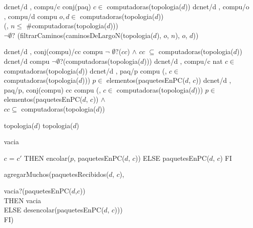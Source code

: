 \begin{tad}{}
\tadOtrasOperaciones
{}
	 {dcnet/d , compu/c} {conj(paq)} {$c\in$ computadoras(topologia($d$))}
	 {dcnet/d , compu/o , compu/d} {compu} {$o,d \in$ computadoras(topologia($d$)) \yluego \\
																				(, $n \leq$ \#computadoras(topologia($d$)))\\
																				$\neg\emptyset?$
																				(filtrarCaminos(caminosDeLargoN(topologia($d$), $o$, $n$),
																				 $o$, $d$))}
		

	 {dcnet/d , conj(compu)/cc} {compu} {$\neg$ $\emptyset?$($cc$) $\wedge$ 
																	$cc$ $\subseteq$ computadoras(topologia($d$))}	
	 {dcnet/d} {compu} {$\neg\emptyset$?(computadoras(topologia($d$)))}   
	 {dcnet/d , compu/c} {nat}	{$c\in$ computadoras(topologia($d$))}							  
	 {dcnet/d , paq/p} {compu} {(, $c \in$ computadoras(topologia($d$))) $p\in$ elementos(paquetesEnPC($d$, $c$))}
	 {dcnet/d , paq/p, conj(compu) cc} {compu} {(, $c \in$ computadoras(topologia($d$))) $p\in$ elementos(paquetesEnPC($d$, $c$)) $\wedge$ \\ $cc \subseteq$ computadoras(topologia($d$))}


	 {topologia($d$)}
	 {topologia($d$)}

	 {vacia}

			
	 { \IF $c$ = $c'$
																	THEN encolar($p$, paquetesEnPC($d$, $c$))
																	ELSE paquetesEnPC($d$, $c$)
																	FI}	
			  {agregarMuchos(paquetesRecibidos($d$, $c$), 			  
			  
			  \hspace*{6.5em}  \IFL vacia?(paquetesEnPC($d$,$c$))\\
			  \hspace*{6.5em}  THEN vacia \\
			  \hspace*{6.5em}  ELSE desencolar(paquetesEnPC($d$, $c$)))\\
			  \hspace*{6.5em}FI)}
	

\end{tad}
